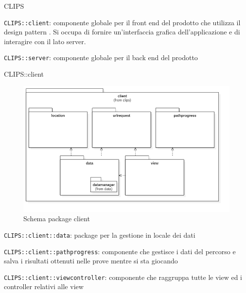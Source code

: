 \begin{componente}{CLIPS}
\begin{compPackageContenuti}
\item \texttt{CLIPS::client}: componente globale per il front end del prodotto che utilizza il design pattern . Si occupa di fornire un'interfaccia grafica dell'applicazione e di interagire con il lato server.
\item \texttt{CLIPS::server}: componente globale per il back end del prodotto
\end{compPackageContenuti}
\end{componente}
\begin{componente}{CLIPS::client}
\begin{figure}[h!]
\centering
\includegraphics[scale=0.4]{img/package/png/client.png}
\caption{Schema package client}
 \end{figure}
\begin{compPackageContenuti}
\item \texttt{CLIPS::client::data}: package per la gestione in locale dei dati
\item \texttt{CLIPS::client::pathprogress}: componente che gestisce i dati del percorso e salva i risultati ottenuti nelle prove mentre si sta giocando
\item \texttt{CLIPS::client::viewcontroller}: componente che raggruppa tutte le view ed i controller relativi alle view
\end{compPackageContenuti}
\end{componente}
